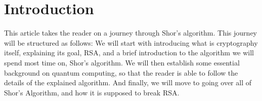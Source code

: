 \section{Introduction}

This article takes the reader on a journey through Shor's algorithm. This
journey will be structured as follows: We will start with introducing what
is cryptography itself, explaining its goal, RSA, and a brief introduction
to the algorithm we will spend most time on, Shor's algorithm.
We will then establish some essential background on quantum computing, so that
the reader is able to follow the details of the explained algorithm.
And finally, we will move to going over all of Shor's Algorithm, and how it
is supposed to break RSA.